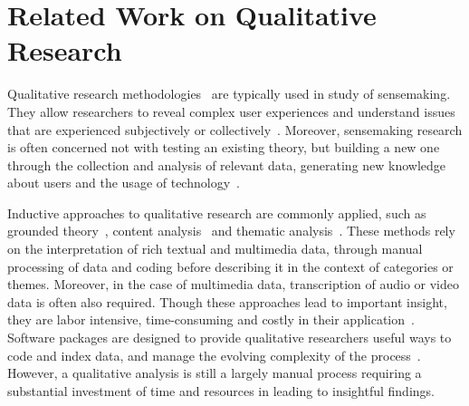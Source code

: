 \section{Related Work on Qualitative Research}
Qualitative research methodologies~\cite{Adams2008} are typically used in study of sensemaking. They allow researchers to reveal complex user experiences and understand issues that are experienced subjectively or collectively~\cite{Pace2004, Adams2008}. Moreover, sensemaking research is often concerned not with testing an existing theory, but building a new one through the collection and analysis of relevant data, generating new knowledge about users and the usage of technology~\cite{Rogers2012}.

Inductive approaches to qualitative research are commonly applied, such as grounded theory~\cite{Corbin1994}, content analysis~\cite{Stemler2001} and thematic analysis~\cite{Guest2011}. These methods rely on the interpretation of rich textual and multimedia data, through manual processing of data and coding before describing it in the context of categories or themes. Moreover, in the case of multimedia data, transcription of audio or video data is often also required. Though these approaches lead to important insight, they are labor intensive, time-consuming and costly in their application~\cite{Wong2002}. Software packages are designed to provide qualitative researchers useful ways to code and index data, and manage the evolving complexity of the process~\cite{Lewins2007}. However, a qualitative analysis is still a largely manual process requiring a substantial investment of time and resources in leading to insightful findings.


